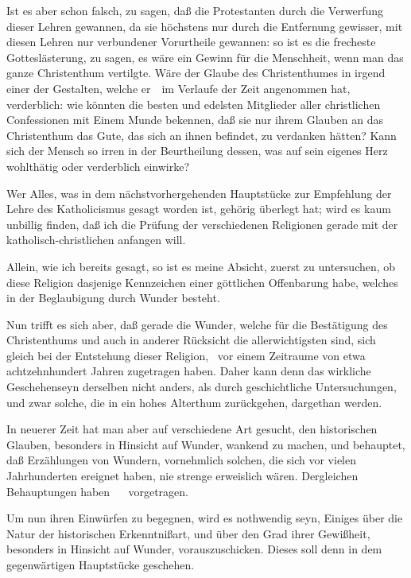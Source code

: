 \begin{aufza}
\begin{aufzb}
\item Ist es aber schon falsch, zu sagen, daß die Protestanten durch die Verwerfung dieser Lehren gewannen, da sie höchstens nur durch die Entfernung gewisser, mit diesen Lehren nur  verbundener Vorurtheile gewannen: so ist es die frecheste Gotteslästerung, zu sagen, es wäre ein Gewinn für die Menschheit, wenn man das ganze Christenthum vertilgte. Wäre der Glaube des Christenthumes in irgend einer der Gestalten, welche er~\ im Verlaufe der Zeit angenommen hat, verderblich: wie könnten die besten und edelsten Mitglieder aller christlichen Confessionen mit Einem Munde bekennen, daß sie nur ihrem Glauben an das Christenthum das Gute, das sich an ihnen befindet, zu verdanken hätten? Kann sich der Mensch so irren in der Beurtheilung dessen, was auf sein eigenes Herz wohlthätig oder verderblich einwirke?~
\end{aufzb}
\end{aufza}



\begin{aufza}
\item Wer Alles, was in dem nächstvorhergehenden Hauptstücke zur Empfehlung der Lehre des Katholicismus gesagt worden ist, gehörig überlegt hat; wird es kaum unbillig finden, daß ich die Prüfung der verschiedenen Religionen gerade mit der katholisch-christlichen anfangen will.
\item Allein, wie ich bereits gesagt, so ist es meine Absicht, zuerst zu untersuchen, ob diese Religion dasjenige Kennzeichen einer göttlichen Offenbarung habe, welches in der Beglaubigung durch Wunder besteht.
\item Nun trifft es sich aber, daß gerade die Wunder, welche für die Bestätigung des Christenthums und auch in anderer Rücksicht die allerwichtigsten sind, sich gleich bei der Entstehung dieser Religion, \dh\ vor einem Zeitraume von etwa achtzehnhundert Jahren zugetragen haben. Daher kann denn das wirkliche Geschehenseyn derselben nicht anders, als durch geschichtliche Untersuchungen, und zwar solche, die in ein hohes Alterthum zurückgehen, dargethan werden.
\item In neuerer Zeit hat man aber auf verschiedene Art gesucht, den historischen Glauben, besonders in Hinsicht auf Wunder, wankend zu machen, und behauptet, daß Erzählungen von Wundern, vornehmlich solchen, die sich vor vielen Jahrhunderten ereignet haben, nie strenge erweislich wären. Dergleichen Behauptungen haben \zB\  \umA\  vorgetragen.~
\item Um nun ihren Einwürfen zu begegnen, wird es nothwendig seyn, Einiges über die Natur der historischen Erkenntnißart, und über den Grad ihrer Gewißheit, besonders in Hinsicht auf Wunder, vorauszuschicken. Dieses soll denn in dem gegenwärtigen Hauptstücke geschehen.
\end{aufza}

